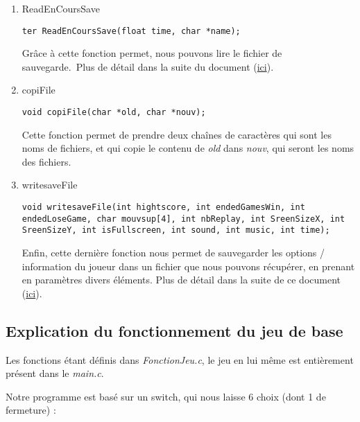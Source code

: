 \documentclass[letter]{article}
\begin{document}
\begin{enumerate}
\item ReadEnCoursSave
\label{sec:org1b2decf}


\begin{verbatim}
ter ReadEnCoursSave(float time, char *name);
\end{verbatim}


Grâce à cette fonction permet, nous pouvons lire le fichier de sauvegarde. Plus de détail dans la suite du document (\hyperref[sec:org4ed625b]{ici}).

\item copiFile
\label{sec:orgad00818}

\begin{verbatim}
void copiFile(char *old, char *nouv);
\end{verbatim}

Cette fonction permet de prendre deux chaînes de caractères qui sont les noms de fichiers, et qui copie le contenu de \emph{old} dans \emph{nouv}, qui seront les noms des fichiers.

\item writesaveFile
\label{sec:org65e9c17}


\begin{verbatim}
void writesaveFile(int hightscore, int endedGamesWin, int endedLoseGame, char mouvsup[4], int nbReplay, int SreenSizeX, int SreenSizeY, int isFullscreen, int sound, int music, int time);
\end{verbatim}

Enfin, cette dernière fonction nous permet de sauvegarder les options / information du joueur dans un fichier que nous pouvons récupérer, en prenant en paramètres divers éléments. Plus
de détail dans la suite de ce document (\hyperref[sec:org4ed625b]{ici}).
\end{enumerate}

\subsection{Explication du fonctionnement du jeu de base}
\label{sec:org2c80fc0}

Les fonctions étant définis dans \emph{FonctionJeu.c}, le jeu en lui même est entièrement présent dans le \emph{main.c}.

Notre programme est basé sur un switch, qui nous laisse 6 choix (dont 1 de fermeture) :
\end{document}
